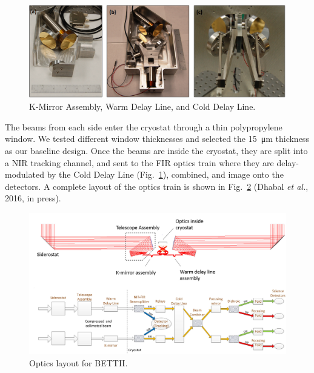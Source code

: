 \begin{figure}[!h]
		\centering
		\includegraphics[width=\textwidth]{Figures/Assemblies.png} 
		\caption[Small optical assemblies]{K-Mirror Assembly, Warm Delay Line, and Cold Delay Line.}
		\label{fig:SmallAssemblies}
\end{figure}

The beams from each side enter the cryostat through a thin polypropylene window. We tested different window thicknesses and selected the \SI{15}{\micro\meter} thickness as our baseline design. %
Once the beams are inside the cryostat, they are split into a NIR tracking channel, and sent to the FIR optics train where they are delay-modulated by the Cold Delay Line (Fig.~\ref{fig:SmallAssemblies}), combined, and image onto the detectors. A complete layout of the optics train is shown in Fig.~\ref{fig:OpticsLayout} (Dhabal \textit{et al.}, 2016, in press).


\begin{figure}[!h]
		\centering
		\includegraphics[width=\textwidth]{Figures/OpticsLayout.png} 
		\caption[Optics layout]{Optics layout for BETTII.}
		\label{fig:OpticsLayout}
\end{figure}


